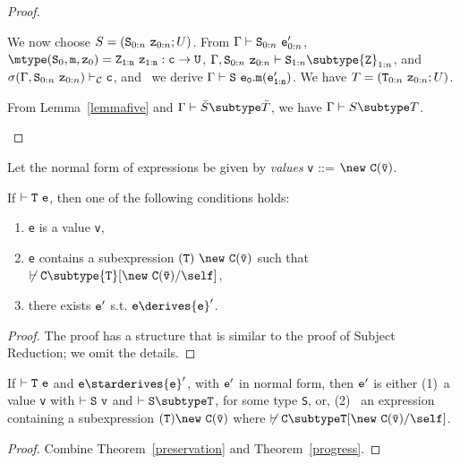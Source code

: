 \begin{proof}
\begin{itemize}
\begin{itemize}
            We now choose 
               $S=({\tt S}_{0:n}\ {\tt z}_{0:n}; U)$.
            From 
            $\Gamma \vdash {\tt S}_{0:n} \ {\tt e}_{0:n}'$,
            $\mtype({\tt S}_0,{\tt m},{\tt z}_0) =
               \tt {\tt Z}_{1:n}\ {\tt z}_{1:n}:c \rightarrow {\tt U}$,
            $\Gamma, {\tt S}_{0:n}\ {\tt z}_{0:n} \vdash
                  {\tt S}_{1:n} \subtype {\tt Z}_{1:n}$, and
            $\sigma(\Gamma, {\tt S}_{0:n}\ {\tt z}_{0:n}) \vdash_{\cal C}
                  {\tt c}$,
            and \TInvk\ we derive
            $\Gamma \vdash {\tt S}\ {\tt e_0.m(e_{1:n}')}$.
            We have 
               $T=({\tt T}_{0:n}\ {\tt z}_{0:n}; U)$.

            From Lemma~\ref{lemmafive} and
            $\Gamma \vdash \bar{S} \subtype \bar{T}$, we have
            $\Gamma \vdash S \subtype T$.
   \end{itemize}
\end{itemize}
\end{proof}

\noindent
Let the normal form of expressions be given by {\em values}
{\tt v} {::=} $\new\ {\tt C(\bar{\tt v})}$.

\begin{theorem}[Progress] 
\label{progress}
If $\vdash {\tt T\ e}$, then one of the following conditions holds:
\begin{enumerate}
\item {\tt e} is a value {\tt v}, 
\item {\tt e} contains a subexpression ${\tt (T)~\new\ C(\bar{\tt
v})}$ such that
$\not\vdash {\tt C} \subtype {\tt T}[{\tt \new\ C(\bar{\tt v})}/\self]$,
\item there exists ${\tt e}'$ s.t. ${\tt e} \derives {\tt e}'$.
\end{enumerate}
\end{theorem}

\begin{proof}
The proof has a structure that is similar to the proof of Subject Reduction;
we omit the details.
\end{proof}

\begin{theorem} 
\label{type-soundness}
If $\vdash {\tt T\ e}$ and ${\tt e} \starderives {\tt e}'$, with ${\tt
e}'$ in normal form, then ${\tt e}'$ is either (1)~a value {\tt v}
with $\vdash {\tt S\ v}$ and $\vdash {\tt S
\subtype T}$, for some type {\tt S}, or, (2)~ an expression containing
a subexpression ${\tt (T)\new\ {\tt C(\bar{\tt v})}}$ where 
$\not\vdash \tt C\subtype T[\new\ C(\bar{\tt v})/\self]$.

\end{theorem}

\begin{proof}
Combine Theorem~\ref{preservation} and Theorem~\ref{progress}.
\end{proof}

